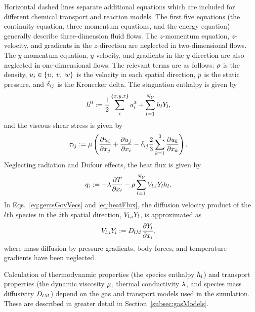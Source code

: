 %
Horizontal dashed lines separate additional equations which are included for different chemical transport and reaction models. The first five equations (the continuity equation, three momentum equations, and the energy equation) generally describe three-dimension fluid flows. The $z$-momentum equation, $z$-velocity, and gradients in the $z$-direction are neglected in two-dimensional flows. The $y$-momentum equation, $y$-velocity, and gradients in the $y$-direction are also neglected in one-dimensional flows. The relevant terms are as follows: $\rho$ is the density, $u_{i} \in \{u, \; v, \; w\}$ is the velocity in each spatial direction, $p$ is the static pressure, and $\delta_{i j}$ is the Kronecker delta. The stagnation enthalpy is given by
%
\begin{equation}\label{eq:stagEnth}
	h^0 := \frac{1}{2} \sum_{i}^{\{x,y,z\}} u_{i}^2 + \sum_{l = 1}^{N_Y} h_{l} Y_{l},
\end{equation}
%
and the viscous shear stress is given by
%
\begin{equation}\label{eq:shearStress}
	\tau_{i j} := \mu \left( \frac{\partial u_{i}}{\partial x_{j}} + \frac{\partial u_{j}}{\partial x_{i}} - \delta_{i j} \frac{2}{3} \sum_{k=1}^3 \frac{\partial u_{k}}{\partial x_{k}} \right).
\end{equation}
%
Neglecting radiation and Dufour effects, the heat flux is given by
%
\begin{equation}\label{eq:heatFlux}
	q_{i} := -\lambda \frac{\partial T}{\partial x_{i}} - \rho \sum_{l = 1}^{N_Y} V_{l,i} Y_{l} h_{l}.
\end{equation}
%
In Eqs.~\ref{eq:gemsGovVecs} and \ref{eq:heatFlux}, the diffusion velocity product of the $l$th species in the $i$th spatial direction, $V_{l,i} Y_{l}$, is approximated as
%
\begin{equation}
	V_{l,i} Y_{l} := D_{l M} \frac{\partial Y_{l}}{\partial x_{i}},
\end{equation}
%
where mass diffusion by pressure gradients, body forces, and temperature gradients have been neglected.

Calculation of thermodynamic properties (the species enthalpy $h_{l}$) and transport properties (the dynamic viscosity $\mu$, thermal conductivity $\lambda$, and species mass diffusivity $D_{l M}$) depend on the gas and transport models used in the simulation. These are described in greater detail in Section~\ref{subsec:gasModels}.


